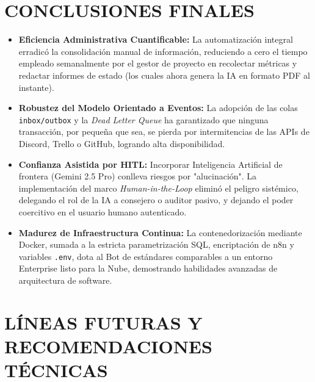 \documentclass{encabezado}
\begin{document}
\section{CONCLUSIONES FINALES}

\begin{itemize}
    \item \textbf{Eficiencia Administrativa Cuantificable:} La automatización integral erradicó la consolidación manual de información, reduciendo a cero el tiempo empleado semanalmente por el gestor de proyecto en recolectar métricas y redactar informes de estado (los cuales ahora genera la IA en formato PDF al instante).
    \item \textbf{Robustez del Modelo Orientado a Eventos:} La adopción de las colas \texttt{inbox/outbox} y la \textit{Dead Letter Queue} ha garantizado que ninguna transacción, por pequeña que sea, se pierda por intermitencias de las APIs de Discord, Trello o GitHub, logrando alta disponibilidad.
    \item \textbf{Confianza Asistida por HITL:} Incorporar Inteligencia Artificial de frontera (Gemini 2.5 Pro) conlleva riesgos por "alucinación". La implementación del marco \textit{Human-in-the-Loop} eliminó el peligro sistémico, delegando el rol de la IA a consejero o auditor pasivo, y dejando el poder coercitivo en el usuario humano autenticado.
    \item \textbf{Madurez de Infraestructura Continua:} La contenedorización mediante Docker, sumada a la estricta parametrización SQL, encriptación de n8n y variables \texttt{.env}, dota al Bot de estándares comparables a un entorno Enterprise listo para la Nube, demostrando habilidades avanzadas de arquitectura de software.
\end{itemize}

\section{LÍNEAS FUTURAS Y RECOMENDACIONES TÉCNICAS}
\end{document}
